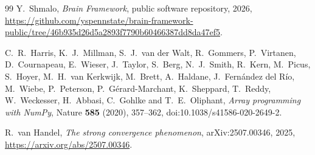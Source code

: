 \documentclass[11pt,a4paper]{article}
\numberwithin{equation}{section}
\theoremstyle{remark}
\begin{document}
\begin{thebibliography}{99}
 Y.~Shmalo, \emph{Brain Framework}, public software repository, 2026, \url{https://github.com/yspennstate/brain-framework-public/tree/46b935d26d5a2893f7790b60466387dd8da47ef5}.

 C.~R.~Harris, K.~J.~Millman, S.~J.~van der Walt, R.~Gommers, P.~Virtanen, D.~Cournapeau, E.~Wieser, J.~Taylor, S.~Berg, N.~J.~Smith, R.~Kern, M.~Picus, S.~Hoyer, M.~H.~van Kerkwijk, M.~Brett, A.~Haldane, J.~Fern\'andez del R\'io, M.~Wiebe, P.~Peterson, P.~G\'erard-Marchant, K.~Sheppard, T.~Reddy, W.~Weckesser, H.~Abbasi, C.~Gohlke and T.~E.~Oliphant, \emph{Array programming with NumPy}, Nature \textbf{585} (2020), 357--362, doi:10.1038/s41586-020-2649-2.

 R.~van Handel, \emph{The strong convergence phenomenon}, arXiv:2507.00346, 2025, \url{https://arxiv.org/abs/2507.00346}.

\end{thebibliography}
\end{document}
